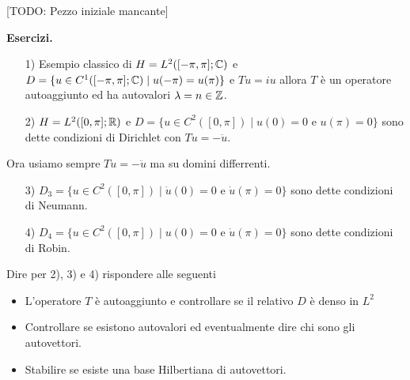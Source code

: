 


[TODO: Pezzo iniziale mancante]

\textbf{Esercizi.}
\begin{enumerate}
	\item[1)] Esempio classico di $H = L^2([-\pi, \pi]; \mathbb C)$ e $D = \{ u \in C^1([-\pi, \pi]; \mathbb C) \mid u(-\pi) = u(\pi) \}$ e $T u = i u$ allora $T$ è un operatore autoaggiunto ed ha autovalori $\lambda = n \in \mathbb Z$.
	
	\item[2)] $H = L^2([0, \pi]; \mathbb R)$ e $D = \{ u \in C^2([0, \pi]) \mid u(0) = 0 \text{ e } u(\pi) = 0 \}$ sono dette condizioni di Dirichlet con $T u = - \ddot u$.
\end{enumerate}

Ora usiamo sempre $T u = -\ddot u$ ma su domini differrenti.

\begin{enumerate}
	\item[3)] $D_3 = \{ u \in C^2([0, \pi]) \mid \dot u(0) = 0 \text{ e } \dot u(\pi) = 0 \}$ sono dette condizioni di Neumann.
	
	\item[4)] $D_4 = \{ u \in C^2([0, \pi]) \mid u(0) = 0 \text{ e } \dot u(\pi) = 0 \}$ sono dette condizioni di Robin.
\end{enumerate}
Dire per 2), 3) e 4) rispondere alle seguenti
\begin{itemize}
	\item L'operatore $T$ è autoaggiunto e controllare se il relativo $D$ è denso in $L^2$
	\item Controllare se esistono autovalori ed eventualmente dire chi sono gli autovettori.
	\item Stabilire se esiste una base Hilbertiana di autovettori.
\end{itemize}

